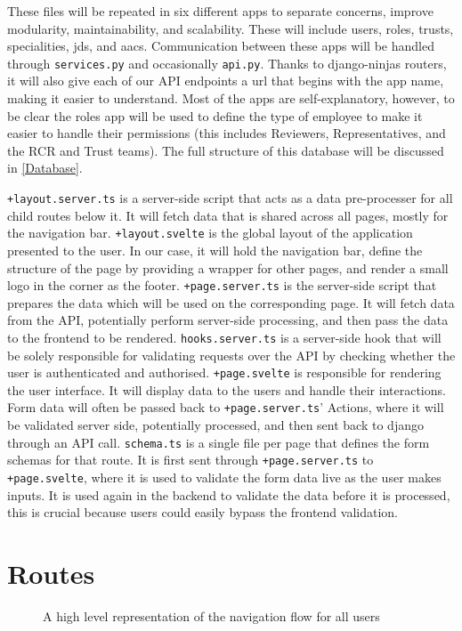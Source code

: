 These files will be repeated in six different apps to separate concerns, improve modularity, maintainability, and scalability. These will include users, roles, trusts, specialities, jds, and aacs. Communication between these apps will be handled through \texttt{services.py} and occasionally \texttt{api.py}. Thanks to django-ninjas routers, it will also give each of our API endpoints a url that begins with the app name, making it easier to understand. Most of the apps are self-explanatory, however, to be clear the roles app will be used to define the type of employee to make it easier to handle their permissions (this includes Reviewers, Representatives, and the RCR and Trust teams). The full structure of this database will be discussed in \ref{Database}.

\texttt{+layout.server.ts} is a server-side script that acts as a data pre-processer for all child routes below it. It will fetch data that is shared across all pages, mostly for the navigation bar. \texttt{+layout.svelte} is the global layout of the application presented to the user. In our case, it will hold the navigation bar, define the structure of the page by providing a wrapper for other pages, and render a small logo in the corner as the footer. \texttt{+page.server.ts} is the server-side script that prepares the data which will be used on the corresponding page. It will fetch data from the API, potentially perform server-side processing, and then pass the data to the frontend to be rendered. \texttt{hooks.server.ts} is a server-side hook that will be solely responsible for validating requests over the API by checking whether the user is authenticated and authorised. \texttt{+page.svelte} is responsible for rendering the user interface. It will display data to the users and handle their interactions. Form data will often be passed back to \texttt{+page.server.ts}' Actions, where it will be validated server side, potentially processed, and then sent back to django through an API call. \texttt{schema.ts} is a single file per page that defines the form schemas for that route. It is first sent through \texttt{+page.server.ts} to \texttt{+page.svelte}, where it is used to validate the form data live as the user makes inputs. It is used again in the backend to validate the data before it is processed, this is crucial because users could easily bypass the frontend validation.

\section{Routes} \label{Routes}
\begin{figure}[h]
\centering
{}
\vspace{-5pt}
\caption{A high level representation of the navigation flow for all users}
\label{fig:ui-all}
\vspace{-5pt}
\end{figure}

